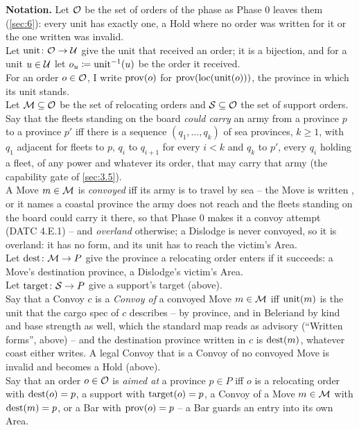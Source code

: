 \documentclass[12pt,a4paper]{article}
\begin{document}
\textbf{Notation.}
Let $\mathcal{O}$ be the set of orders of the phase as Phase 0 leaves them (\cref{sec:6}): every unit has exactly one, a Hold where no order was written for it or the one written was invalid.\\
Let $\operatorname{unit}\colon \mathcal{O} \to \mathcal{U}$ give the unit that received an order; it is a bijection, and for a unit $u \in \mathcal{U}$ let $o_u \coloneqq \operatorname{unit}^{-1}(u)$ be the order it received.\\
For an order $o \in \mathcal{O}$, I write $\operatorname{prov}(o)$ for $\operatorname{prov}(\operatorname{loc}(\operatorname{unit}(o)))$, the province in which its unit stands.\\
Let $\mathcal{M} \subseteq \mathcal{O}$ be the set of relocating orders and $\mathcal{S} \subseteq \mathcal{O}$ the set of support orders.\\
Say that the fleets standing on the board \emph{could carry} an army from a province $p$ to a province $p'$ iff there is a sequence $(q_1, \dots, q_k)$ of sea provinces, $k \ge 1$, with $q_1$ adjacent for fleets to $p$, $q_i$ to $q_{i+1}$ for every $i < k$ and $q_k$ to $p'$, every $q_i$ holding a fleet, of any power and whatever its order, that may carry that army (the capability gate of \cref{sec:3.5}).\\
A Move $m \in \mathcal{M}$ is \emph{convoyed} iff its army is to travel by sea -- the Move is written , or it names a coastal province the army does not reach and the fleets standing on the board could carry it there, so that Phase 0 makes it a convoy attempt (DATC 4.E.1) -- and \emph{overland} otherwise; a Dislodge is never convoyed, so it is overland: it has no  form, and its unit has to reach the victim's Area.\\
Let $\operatorname{dest}\colon \mathcal{M} \to P$ give the province a relocating order enters if it succeeds: a Move's destination province, a Dislodge's victim's Area.\\
Let $\operatorname{target}\colon \mathcal{S} \to P$ give a support's target (above).\\
Say that a Convoy $c$ is a \emph{Convoy of} a convoyed Move $m \in \mathcal{M}$ iff $\operatorname{unit}(m)$ is the unit that the cargo spec of $c$ describes -- by province, and in Beleriand by kind and base strength as well, which the standard map reads as advisory (``Written forms'', above) -- and the destination province written in $c$ is $\operatorname{dest}(m)$, whatever coast either writes.
A legal Convoy that is a Convoy of no convoyed Move is invalid and becomes a Hold (above).\\
Say that an order $o \in \mathcal{O}$ is \emph{aimed at} a province $p \in P$ iff $o$ is a relocating order with $\operatorname{dest}(o) = p$, a support with $\operatorname{target}(o) = p$, a Convoy of a Move $m \in \mathcal{M}$ with $\operatorname{dest}(m) = p$, or a Bar with $\operatorname{prov}(o) = p$ -- a Bar guards an entry into its own Area.\\
\end{document}

